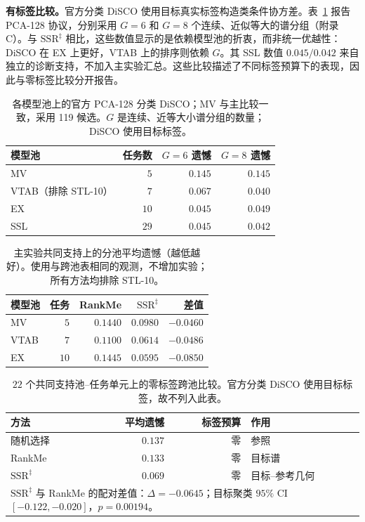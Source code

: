 \documentclass{article}
\newcommand{\SSRdag}{\ensuremath{\mathrm{SSR}^{\ddagger}}\xspace}
\begin{document}
\textbf{有标签比较。}官方分类 DiSCO 使用目标真实标签构造类条件协方差。表~\ref{tab:official_disco_zh} 报告 PCA-128 协议，分别采用 $G=6$ 和 $G=8$ 个连续、近似等大的谱分组（附录 C）。与 \SSRdag 相比，这些数值显示的是依赖模型池的折衷，而非统一优越性：DiSCO 在 EX 上更好，VTAB 上的排序则依赖 $G$。其 SSL 数值 $0.045/0.042$ 来自独立的诊断支持，不加入主实验汇总。这些比较描述了不同标签预算下的表现，因此与零标签比较分开报告。

\begin{table}[h]
\centering\small
\caption{各模型池上的官方 PCA-128 分类 DiSCO；MV 与主比较一致，采用 119 候选。$G$ 是连续、近等大小谱分组的数量；DiSCO 使用目标标签。}
\label{tab:official_disco_zh}
\begin{tabular}{lrrr}
\toprule
模型池 & 任务数 & $G=6$ 遗憾 & $G=8$ 遗憾 \\
\midrule
MV & $5$ & $0.145$ & $0.145$ \\
VTAB（排除 STL-10） & $7$ & $0.067$ & $0.040$ \\
EX & $10$ & $0.045$ & $0.049$ \\
SSL & $29$ & $0.045$ & $0.042$ \\
\bottomrule
\end{tabular}
\end{table}

\begin{table}[h]
\centering\small
\caption{主实验共同支持上的分池平均遗憾（越低越好）。使用与跨池表相同的观测，不增加实验；所有方法均排除 STL-10。}
\label{tab:pool_regrets_zh}
\begin{tabular}{lrrrr}
\toprule
模型池 & 任务 & RankMe & \SSRdag & 差值 \\
\midrule
MV & $5$ & $0.1440$ & $0.0980$ & $-0.0460$ \\
VTAB & $7$ & $0.1100$ & $0.0614$ & $-0.0486$ \\
EX & $10$ & $0.1445$ & $0.0595$ & $-0.0850$ \\
\bottomrule
\end{tabular}
\end{table}

\begin{table}[h]
\centering\small
\caption{$22$ 个共同支持池--任务单元上的零标签跨池比较。官方分类 DiSCO 使用目标标签，故不列入此表。}
\label{tab:crosspool_zh}
\begin{tabular}{lrrl}
\toprule
方法 & 平均遗憾 & 标签预算 & 作用 \\
\midrule
随机选择 & $0.137$ & 零 & 参照 \\
RankMe & $0.133$ & 零 & 目标谱 \\
\textbf{\SSRdag} & $\mathbf{0.069}$ & 零 & 目标--参考几何 \\
\midrule
\multicolumn{4}{p{0.94\linewidth}}{\small \SSRdag 与 RankMe 的配对差值：$\Delta=-0.0645$；目标聚类 $95\%$ CI $[-0.122,-0.020]$，$p=0.00194$。} \\
\bottomrule
\end{tabular}
\end{table}
\end{document}
